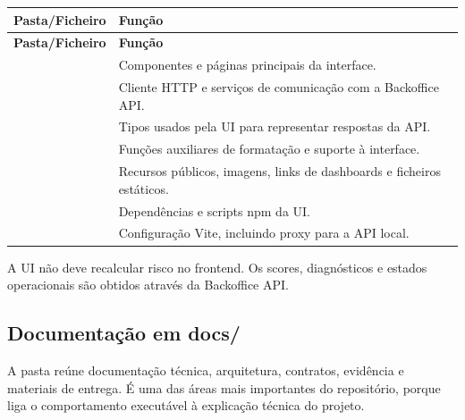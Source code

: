 \begin{longtable}{L{0.34\textwidth} L{0.56\textwidth}}
\toprule
\textbf{Pasta/Ficheiro} & \textbf{Função} \\
\midrule
\endfirsthead
\toprule
\textbf{Pasta/Ficheiro} & \textbf{Função} \\
\midrule
\endhead
{} & Componentes e páginas principais da interface. \\
 & Cliente HTTP e serviços de comunicação com a Backoffice API. \\
 & Tipos usados pela UI para representar respostas da API. \\
 & Funções auxiliares de formatação e suporte à interface. \\
 & Recursos públicos, imagens, links de dashboards e ficheiros estáticos. \\
 & Dependências e scripts npm da UI. \\
 & Configuração Vite, incluindo proxy para a API local. \\
\bottomrule
\end{longtable}

A UI não deve recalcular risco no frontend. Os scores, diagnósticos e estados operacionais são obtidos através da Backoffice API.

\subsection{Documentação em docs/}

A pasta  reúne documentação técnica, arquitetura, contratos, evidência e materiais de entrega. É uma das áreas mais importantes do repositório, porque liga o comportamento executável à explicação técnica do projeto.

